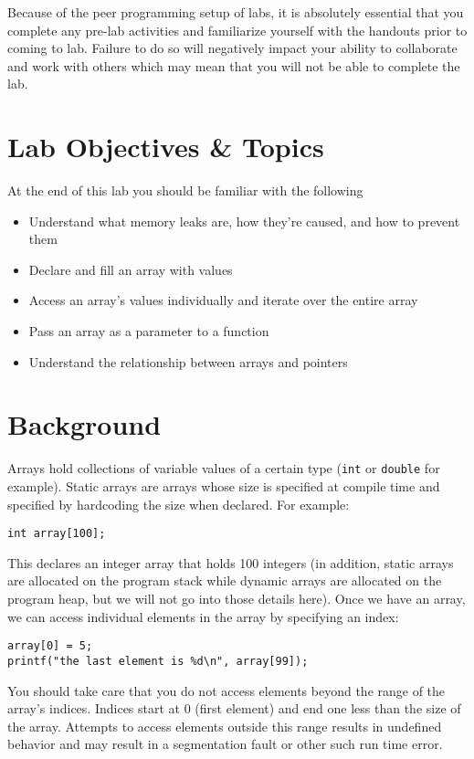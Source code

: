 \documentclass[12pt]{scrartcl}
\begin{document}
Because of the peer programming setup of labs, it is absolutely 
essential that you complete any pre-lab activities and familiarize
yourself with the handouts prior to coming to lab.  Failure to do
so will negatively impact your ability to collaborate and work with 
others which may mean that you will not be able to complete the
lab.  

\section{Lab Objectives \& Topics}
At the end of this lab you should be familiar with the following
\begin{itemize}
  \item Understand what memory leaks are, how they're caused, 
  	and how to prevent them
  \item Declare and fill an array with values
  \item Access an array's values individually and iterate over the entire array
  \item Pass an array as a parameter to a function
  \item Understand the relationship between arrays and pointers
\end{itemize}

\section{Background}

Arrays hold collections of variable values of a certain type 
(\texttt{int} or \texttt{double} for example).
Static arrays are arrays whose size is specified at compile 
time and specified by hardcoding the size when declared.  
For example:

\texttt{int array[100];}

This declares an integer array that holds 100 integers (in 
addition, static arrays are allocated on the program stack 
while dynamic arrays are allocated on the program heap, 
but we will not go into those details here).  Once we have 
an array, we can access individual elements in the array by 
specifying an index:

\begin{verbatim}
array[0] = 5;
printf("the last element is %d\n", array[99]);
\end{verbatim}

You should take care that you do not access elements beyond 
the range of the array's indices.  Indices start at 0 (first element) 
and end one less than the size of the array.  Attempts to access 
elements outside this range results in undefined behavior and 
may result in a segmentation fault or other such run time error.
\end{document}
